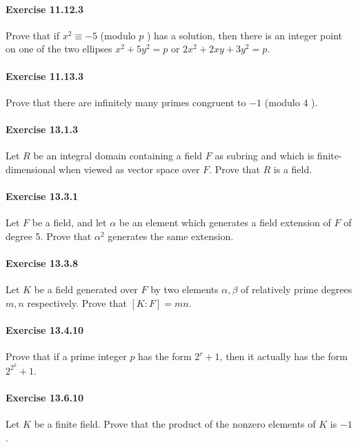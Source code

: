 \documentclass{article}
\begin{document}
\paragraph{Exercise 11.12.3} Prove that if $x^2 \equiv-5$ (modulo $p$ ) has a solution, then there is an integer point on one of the two ellipses $x^2+5 y^2=p$ or $2 x^2+2 x y+3 y^2=p$. 

\paragraph{Exercise 11.13.3} Prove that there are infinitely many primes congruent to $-1$ (modulo 4 ).

\paragraph{Exercise 13.1.3} Let $R$ be an integral domain containing a field $F$ as subring and which is finite-dimensional when viewed as vector space over $F$. Prove that $R$ is a field.

\paragraph{Exercise 13.3.1} Let $F$ be a field, and let $\alpha$ be an element which generates a field extension of $F$ of degree 5. Prove that $\alpha^2$ generates the same extension.

\paragraph{Exercise 13.3.8} Let $K$ be a field generated over $F$ by two elements $\alpha, \beta$ of relatively prime degrees $m, n$ respectively. Prove that $[K: F]=m n$.

\paragraph{Exercise 13.4.10} Prove that if a prime integer $p$ has the form $2^r+1$, then it actually has the form $2^{2^k}+1$. 

\paragraph{Exercise 13.6.10} Let $K$ be a finite field. Prove that the product of the nonzero elements of $K$ is $-1$.
\end{document}
